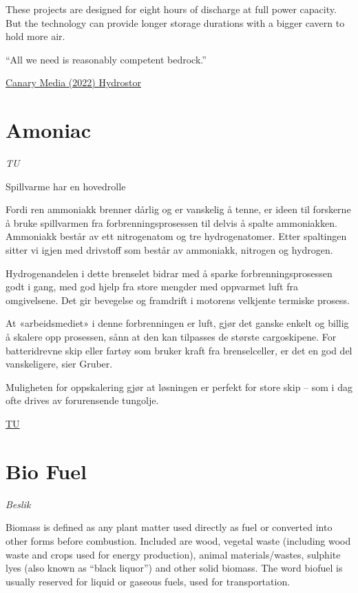 \documentclass[
]{book}
\begin{document}
These projects are designed for eight hours of discharge at full power capacity. But the technology can provide longer storage durations with a bigger cavern to hold more air.

``All we need is reasonably competent bedrock.''

\href{https://www.canarymedia.com/articles/long-duration-energy-storage/goldman-sachs-just-made-a-record-setting-investment-in-long-duration-energy-storage}{Canary Media (2022) Hydrostor}

\hypertarget{amoniac}{%
\chapter{Amoniac}\label{amoniac}}

\emph{TU}

Spillvarme har en hovedrolle

Fordi ren ammoniakk brenner dårlig og er vanskelig å tenne, er ideen til forskerne å bruke spillvarmen fra forbrenningsprosessen til delvis å spalte ammoniakken. Ammoniakk består av ett nitrogenatom og tre hydrogenatomer. Etter spaltingen sitter vi igjen med drivstoff som består av ammoniakk, nitrogen og hydrogen.

Hydrogenandelen i dette brenselet bidrar med å sparke forbrenningsprosessen godt i gang, med god hjelp fra store mengder med oppvarmet luft fra omgivelsene. Det gir bevegelse og framdrift i motorens velkjente termiske prosess.

At «arbeidsmediet» i denne forbrenningen er luft, gjør det ganske enkelt og billig å skalere opp prosessen, sånn at den kan tilpasses de største cargoskipene. For batteridrevne skip eller fartøy som bruker kraft fra brenselceller, er det en god del vanskeligere, sier Gruber.

Muligheten for oppskalering gjør at løsningen er perfekt for store skip -- som i dag ofte drives av forurensende tungolje.

\href{https://www.tu.no/artikler/ammoniakk-kan-gjore-langdistanse-skipsfart-helgronn/511245}{TU}

\hypertarget{bio-fuel}{%
\chapter{Bio Fuel}\label{bio-fuel}}

\emph{Beslik}

Biomass is defined as any plant matter used directly as fuel or converted into other forms before combustion. Included are wood, vegetal waste (including wood waste and crops used for energy production), animal materials/wastes, sulphite lyes (also known as ``black liquor'') and other solid biomass. The word biofuel is usually reserved for liquid or gaseous fuels, used for transportation.
\end{document}
